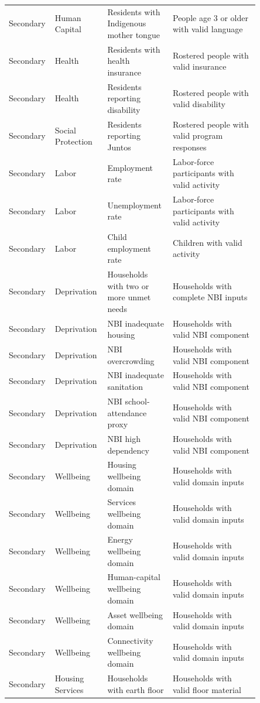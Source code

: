 \begin{longtable}{p{0.10\linewidth}p{0.18\linewidth}p{0.24\linewidth}p{0.33\linewidth}}
Secondary & Human Capital & Residents with Indigenous mother tongue & People age 3 or older with valid language \\
Secondary & Health & Residents with health insurance & Rostered people with valid insurance \\
Secondary & Health & Residents reporting disability & Rostered people with valid disability \\
Secondary & Social Protection & Residents reporting Juntos & Rostered people with valid program responses \\
Secondary & Labor & Employment rate & Labor-force participants with valid activity \\
Secondary & Labor & Unemployment rate & Labor-force participants with valid activity \\
Secondary & Labor & Child employment rate & Children with valid activity \\
Secondary & Deprivation & Households with two or more unmet needs & Households with complete NBI inputs \\
Secondary & Deprivation & NBI inadequate housing & Households with valid NBI component \\
Secondary & Deprivation & NBI overcrowding & Households with valid NBI component \\
Secondary & Deprivation & NBI inadequate sanitation & Households with valid NBI component \\
Secondary & Deprivation & NBI school-attendance proxy & Households with valid NBI component \\
Secondary & Deprivation & NBI high dependency & Households with valid NBI component \\
Secondary & Wellbeing & Housing wellbeing domain & Households with valid domain inputs \\
Secondary & Wellbeing & Services wellbeing domain & Households with valid domain inputs \\
Secondary & Wellbeing & Energy wellbeing domain & Households with valid domain inputs \\
Secondary & Wellbeing & Human-capital wellbeing domain & Households with valid domain inputs \\
Secondary & Wellbeing & Asset wellbeing domain & Households with valid domain inputs \\
Secondary & Wellbeing & Connectivity wellbeing domain & Households with valid domain inputs \\
Secondary & Housing Services & Households with earth floor & Households with valid floor material \\

\end{longtable}

